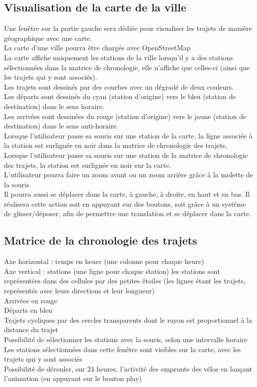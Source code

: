 \documentclass[12pt]{article}
\begin{document}
		\subsection{Visualisation de la carte de la ville}
		Une fenêtre sur la partie gauche sera dédiée pour visualiser les trajets de
		manière géographique avec une carte.\\
		La carte d’une ville pourra être chargée avec OpenStreetMap\\
		La carte affiche uniquement les stations de la ville lorsqu’il y a des stations
		sélectionnées dans la matrice de chronologie, elle n’affiche que celles-ci (ainsi
		que les trajets qui y sont associés).\\
		Les trajets sont dessinés par des courbes avec un dégradé de deux couleurs.\\
		Les départs sont dessinés du cyan (station d’origine) vers le bleu (station de
		destination) dans le sens horaire.\\
		Les arrivées sont dessinées du rouge (station d’origine) vers le jaune
		(station de destination) dans le sens anti-horaire.\\
		Lorsque l’utilisateur passe sa souris sur une station de la carte, la ligne associée
		à la station est surlignée en noir dans la matrice de chronologie des trajets.\\
		Lorsque l’utilisateur passe sa souris sur une station de la matrice de chronologie
		des trajets, la station est surlignée en noir sur la carte.\\
		L’utilisateur pourra faire un zoom avant ou un zoom arrière grâce à la molette de la
		souris.\\
		Il pourra aussi se déplacer dans la carte, à gauche, à droite, en haut et en bas. Il
		réalisera cette action soit en appuyant sur des boutons, soit grâce à un système
		de glisser/déposer, afin de permettre une translation et se déplacer dans la carte.\\
		
		\subsection{Matrice de la chronologie des trajets}
		Axe horizontal : temps en heure (une colonne pour chaque heure)\\
		Axe vertical : stations (une ligne pour chaque station) les stations sont représentées dans
		des cellules par des petites étoiles (les lignes étant les trajets, représentés
		avec leurs directions et leur longueur)\\
		Arrivées en rouge\\
		Départs en bleu\\
		Trajets cycliques par des cercles transparents dont le rayon est proportionnel à
		la distance du trajet\\
		Possibilité de sélectionner les stations avec la souris, selon une intervalle horaire
		Les stations sélectionnées dans cette fenêtre sont visibles sur la carte, avec
		les trajets qui y sont associés\\
		Possibilité de dérouler, sur 24 heures, l’activité des emprunts des vélos
		en lançant l’animation (en appuyant sur le bouton play)\\
		
\end{document}
